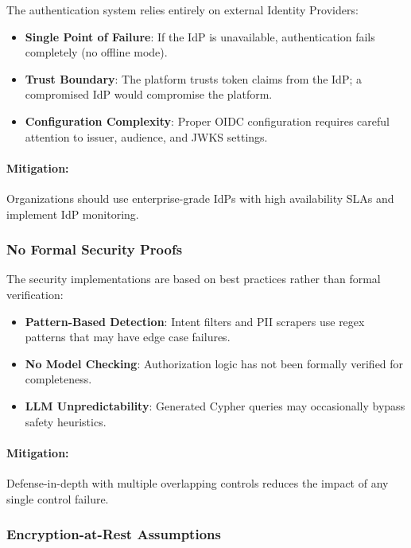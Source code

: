 The authentication system relies entirely on external Identity Providers:

\begin{itemize}
    \item \textbf{Single Point of Failure}: If the IdP is unavailable, authentication fails completely (no offline mode).
    \item \textbf{Trust Boundary}: The platform trusts token claims from the IdP; a compromised IdP would compromise the platform.
    \item \textbf{Configuration Complexity}: Proper OIDC configuration requires careful attention to issuer, audience, and JWKS settings.
\end{itemize}

\paragraph{Mitigation:} Organizations should use enterprise-grade IdPs with high availability SLAs and implement IdP monitoring.

\subsubsection{No Formal Security Proofs}

The security implementations are based on best practices rather than formal verification:

\begin{itemize}
    \item \textbf{Pattern-Based Detection}: Intent filters and PII scrapers use regex patterns that may have edge case failures.
    \item \textbf{No Model Checking}: Authorization logic has not been formally verified for completeness.
    \item \textbf{LLM Unpredictability}: Generated Cypher queries may occasionally bypass safety heuristics.
\end{itemize}

\paragraph{Mitigation:} Defense-in-depth with multiple overlapping controls reduces the impact of any single control failure.

\subsubsection{Encryption-at-Rest Assumptions}

